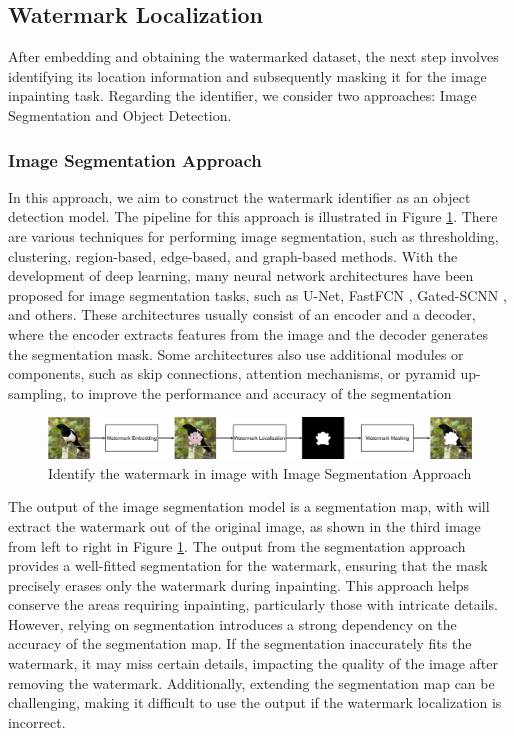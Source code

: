 \subsection{Watermark Localization}
After embedding and obtaining the watermarked dataset, the next step involves identifying its location information and subsequently masking it for the image inpainting task. Regarding the identifier, we consider two approaches: Image Segmentation and Object Detection.
\subsubsection{Image Segmentation Approach}
In this approach, we aim to construct the watermark identifier as an object detection model. The pipeline for this approach is illustrated in Figure \ref{figure:segmentation}. There are various techniques for performing image segmentation, such as thresholding, clustering, region-based, edge-based, and graph-based methods. With the development of deep learning, many neural network architectures have been proposed for image segmentation tasks, such as U-Net, FastFCN \cite{wu2019fastfcn}, Gated-SCNN \cite{takikawa2019gated}, and others. These architectures usually consist of an encoder and a decoder, where the encoder extracts features from the image and the decoder generates the segmentation mask. Some architectures also use additional modules or components, such as skip connections, attention mechanisms, or pyramid up-sampling, to improve the performance and accuracy of the segmentation
\begin{figure}[t]
 \centering
 \includegraphics[width=\linewidth]{img/segmentation.png}
 \caption{Identify the watermark in image with Image Segmentation Approach}
 \label{figure:segmentation}
\end{figure}

The output of the image segmentation model is a segmentation map, with will extract the watermark out of the original image, as shown in the third image from left to right in Figure \ref{figure:segmentation}. The output from the segmentation approach provides a well-fitted segmentation for the watermark, ensuring that the mask precisely erases only the watermark during inpainting. This approach helps conserve the areas requiring inpainting, particularly those with intricate details. However, relying on segmentation introduces a strong dependency on the accuracy of the segmentation map. If the segmentation inaccurately fits the watermark, it may miss certain details, impacting the quality of the image after removing the watermark. Additionally, extending the segmentation map can be challenging, making it difficult to use the output if the watermark localization is incorrect.
